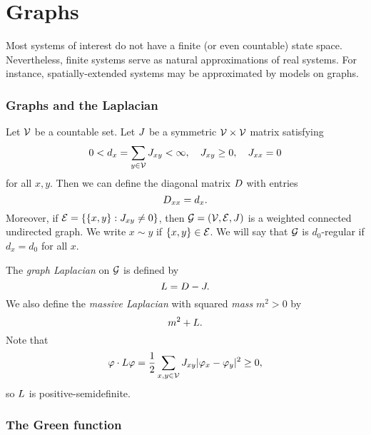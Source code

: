 
\section{Graphs}

Most systems of interest do not have a finite (or even countable) state space. Nevertheless,
finite systems serve as natural approximations of real systems. For instance, spatially-extended
systems may be approximated by models on graphs.

\subsubsection{Graphs and the Laplacian}

Let $\mathcal{V}$ be a countable set.
Let $J$ be a symmetric $\mathcal{V}\times\mathcal{V}$ matrix satisfying
\begin{equation}
0 < d_x = \sum_{y\in\mathcal{V}} J_{xy} < \infty,
  \quad
J_{xy} \ge 0,
  \quad
J_{xx} = 0
\end{equation}
for all $x, y$. Then we can define the diagonal matrix $D$ with entries
\begin{equation}
D_{xx} = d_x.
\end{equation}
Moreover, if $\mathcal{E} = \{ \{ x, y \} : J_{xy} \ne 0 \}$, then
$\mathcal{G} = (\mathcal{V}, \mathcal{E}, J)$ is a weighted connected undirected graph.
We write $x \sim y$ if $\{ x, y \} \in \mathcal{E}$. We will say that $\mathcal{G}$ is
$d_0$-regular if $d_x = d_0$ for all $x$.

The \emph{graph Laplacian} on $\mathcal{G}$ is defined by
\begin{equation}
L = D - J.
\end{equation}
We also define the \emph{massive Laplacian} with squared \emph{mass} $m^2 > 0$
by
\begin{equation}
m^2 + L.
\end{equation}
Note that
\begin{equation}
\varphi \cdot L \varphi
  =
\frac{1}{2} \sum_{x,y\in\mathcal{V}} J_{xy} |\varphi_x - \varphi_y|^2
  \ge
0,
\end{equation}
so $L$ is positive-semidefinite.

\subsubsection{The Green function}

